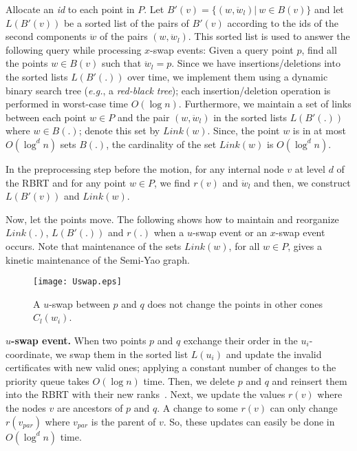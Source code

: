 \documentclass[11pt]{llncs}
\newcommand{\eg}{\emph{e.g.}}
\begin{document}
Allocate an \textit{id} to each point in $P$. Let $B'(v)=\{(w,\ddot{w}_l)|~w\in B(v)\}$ and let $L(B'(v))$ be a sorted list of the pairs of $B'(v)$ according to the ids of the second components $\ddot{w}$ of the pairs $(w,\ddot{w}_l)$. This sorted list is used to answer the following query while processing $x$-swap events: Given a query point $p$, find all the points $w\in B(v)$ such that $\ddot{w}_l=p$. Since we have insertions/deletions into the sorted lists $L(B'(.))$ over time, we implement them using a dynamic binary search tree (\eg, a \textit{red-black tree}); each insertion/deletion operation is performed in worst-case time $O(\log n)$. Furthermore, we maintain a set of links between each point $w\in P$ and the pair $(w,\ddot{w}_l)$ in the sorted lists $L(B'(.))$ where $w\in B(.)$; denote this set by $Link(w)$. Since, the point $w$ is in at most $O(\log^d n)$ sets $B(.)$, the cardinality of the set $Link(w)$ is $O(\log^d n)$.

In the preprocessing step before the motion, for any internal node $v$ at level $d$ of the RBRT and for any point $w\in P$, we find $r(v)$ and $\ddot{w}_l$ and then, we construct $L(B'(v))$ and $Link(w)$.


Now, let the points move. The following shows how to maintain and reorganize $Link(.)$, $L(B'(.))$ and $r(.)$  when a $u$-swap event or an $x$-swap event occurs. Note that maintenance of the sets $Link(w)$, for all $w\in P$, gives a kinetic maintenance of the Semi-Yao graph.

\begin{wrapfigure}{r}{0.4\textwidth}
\vspace{-25pt}
  \begin{center}
    \texttt{[image: Uswap.eps]}
  \end{center}
  \vspace{-10pt}
  \caption{\small A $u$-swap between $p$ and $q$ does not change the points in other cones $C_l(w_i)$.}
  \vspace{-15pt}
  \label{fig:Uswap}
\end{wrapfigure}
\textbf{$u$-swap event.}
When two points $p$ and $q$ exchange their order in the $u_i$-coordinate, we swap them in the sorted list $L(u_i)$ and update the invalid certificates with new valid ones; applying a constant number of changes to the priority queue takes $O(\log n)$ time. Then, we delete $p$ and $q$ and reinsert them into the RBRT with their new ranks~\cite{Abam:2011:KSX:1971362.1971367}. Next, we update the values $r(v)$ where the nodes $v$ are ancestors of $p$ and $q$. A change to some $r(v)$ can only change $r(v_{par})$ where $v_{par}$ is the parent of $v$. So, these updates can easily be done in $O(\log^d n)$ time.
\end{document}

